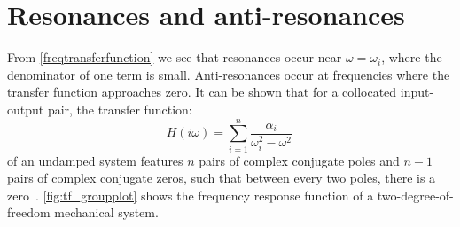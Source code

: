 \documentclass[../Thesis-IJspeert.tex]{subfiles}
\begin{document}
\section{Resonances and anti-resonances}
From \autoref{freqtransferfunction} we see that resonances occur near $\omega=\omega_{i}$, where the denominator of one term is small. Anti-resonances occur at frequencies where the transfer function approaches zero. It can be shown that for a collocated input-output pair, the transfer function:
\begin{equation}
H(i\omega) = \sum_{i=1}^{n} \frac{\alpha_{i}}{\omega_{i}^{2}-\omega^{2}}\,
\end{equation}
of an undamped system features $n$ pairs of complex conjugate poles and $n - 1$ pairs of complex conjugate zeros, such that between every two poles, there is a zero~\cite{Aphale2007}. \autoref{fig:tf_groupplot} shows the frequency response function of a two-degree-of-freedom mechanical system.
\end{document}
